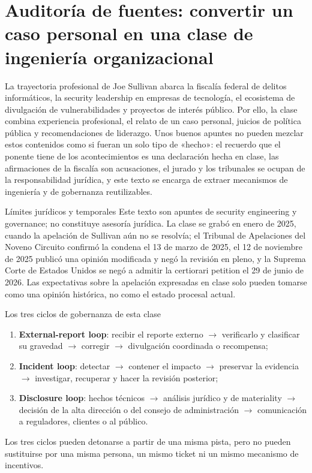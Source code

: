\documentclass[a4paper]{article}
\begin{document}
\makecscover

\section{Auditoría de fuentes: convertir un caso personal en una clase de ingeniería organizacional}

La trayectoria profesional de Joe Sullivan abarca la fiscalía federal de delitos informáticos, la security leadership en empresas de tecnología, el ecosistema de divulgación de vulnerabilidades y proyectos de interés público. Por ello, la clase combina experiencia profesional, el relato de un caso personal, juicios de política pública y recomendaciones de liderazgo. Unos buenos apuntes no pueden mezclar estos contenidos como si fueran un solo tipo de «hecho»: el recuerdo que el ponente tiene de los acontecimientos es una declaración hecha en clase, las afirmaciones de la fiscalía son acusaciones, el jurado y los tribunales se ocupan de la responsabilidad jurídica, y este texto se encarga de extraer mecanismos de ingeniería y de gobernanza reutilizables.

\begin{warningbox}{Límites jurídicos y temporales}
Este texto son apuntes de security engineering y governance; no constituye asesoría jurídica. La clase se grabó en enero de 2025, cuando la apelación de Sullivan aún no se resolvía; el Tribunal de Apelaciones del Noveno Circuito confirmó la condena el 13 de marzo de 2025, el 12 de noviembre de 2025 publicó una opinión modificada y negó la revisión en pleno, y la Suprema Corte de Estados Unidos se negó a admitir la certiorari petition el 29 de junio de 2026. Las expectativas sobre la apelación expresadas en clase solo pueden tomarse como una opinión histórica, no como el estado procesal actual.
\end{warningbox}

\begin{importantbox}{Los tres ciclos de gobernanza de esta clase}
\begin{enumerate}
  \item \textbf{External-report loop}: recibir el reporte externo $\rightarrow$ verificarlo y clasificar su gravedad $\rightarrow$ corregir $\rightarrow$ divulgación coordinada o recompensa;
  \item \textbf{Incident loop}: detectar $\rightarrow$ contener el impacto $\rightarrow$ preservar la evidencia $\rightarrow$ investigar, recuperar y hacer la revisión posterior;
  \item \textbf{Disclosure loop}: hechos técnicos $\rightarrow$ análisis jurídico y de materiality $\rightarrow$ decisión de la alta dirección o del consejo de administración $\rightarrow$ comunicación a reguladores, clientes o al público.
\end{enumerate}
Los tres ciclos pueden detonarse a partir de una misma pista, pero no pueden sustituirse por una misma persona, un mismo ticket ni un mismo mecanismo de incentivos.
\end{importantbox}
\end{document}
